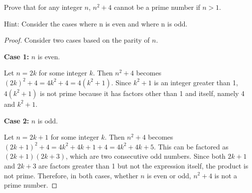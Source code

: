 \documentclass[
	12pt, %
	fleqn, %
	a4paper, %
]{LegrandOrangeBook}
\begin{document}
\begin{exercise}
Prove that for any integer \( n \), \( n^2 + 4 \) cannot be a prime number if \( n > 1 \).
\end{exercise}
Hint: Consider the cases where n is even and where n is odd.
\begin{proof}
Consider two cases based on the parity of \( n \).

\textbf{Case 1:} \( n \) is even.

Let \( n = 2k \) for some integer \( k \). Then \( n^2 + 4 \) becomes \( (2k)^2 + 4 = 4k^2 + 4 = 4(k^2 + 1) \). Since \( k^2 + 1 \) is an integer greater than 1, \( 4(k^2 + 1) \) is not prime because it has factors other than 1 and itself, namely 4 and \( k^2 + 1 \).

\textbf{Case 2:} \( n \) is odd.

Let \( n = 2k + 1 \) for some integer \( k \). Then \( n^2 + 4 \) becomes \( (2k + 1)^2 + 4 = 4k^2 + 4k + 1 + 4 = 4k^2 + 4k + 5 \). This can be factored as \( (2k + 1)(2k + 3) \), which are two consecutive odd numbers. Since both \( 2k + 1 \) and \( 2k + 3 \) are factors greater than 1 but not the expression itself, the product is not prime.
Therefore, in both cases, whether \( n \) is even or odd, \( n^2 + 4 \) is not a prime number.
\end{proof}
\end{document}
